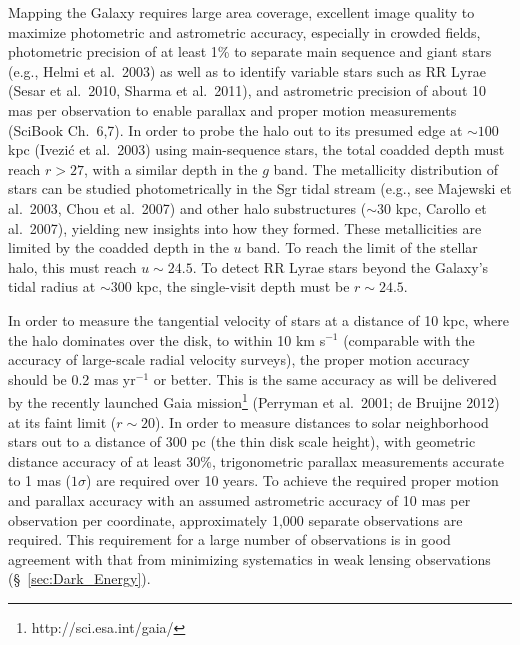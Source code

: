 Mapping the Galaxy requires large area coverage, excellent image
quality to maximize photometric and astrometric accuracy,
especially in crowded fields, photometric precision of at least 1\% to
separate main sequence and
giant stars (e.g., Helmi et al.~2003) as well as to identify variable
stars such as RR Lyrae (Sesar et al.~2010, Sharma et al.~2011),
and astrometric precision of about 10 mas per observation to enable parallax and proper motion measurements
(SciBook Ch.~6,7). In order to probe the halo out to its presumed edge at $\sim100$ kpc (Ivezi\'{c} et al.~2003) using
main-sequence stars, the total coadded depth must reach $r > 27$, with a similar depth in the $g$ band.
The metallicity distribution of stars can be studied photometrically in the Sgr tidal stream (e.g., see
Majewski et al.~2003, Chou et al.~2007) and other halo substructures
($\sim 30$ kpc, Carollo et al.~2007), yielding new insights into how
they formed.  These
metallicities are limited by the coadded depth in the $u$ band.  To reach the limit of the stellar halo, this must reach
$u\sim24.5$. To detect RR Lyrae stars beyond the Galaxy's tidal radius at $\sim 300$ kpc, the single-visit depth must
be $r \sim  24.5$.

In order to measure the tangential velocity of stars at a distance of 10 kpc, where the halo dominates over the disk, to
within 10 km s$^{-1}$ (comparable with the accuracy of
large-scale radial velocity surveys), the proper motion
accuracy should be 0.2 mas yr$^{-1}$ or better. This is the same accuracy as will be delivered by the recently launched Gaia mission\footnote{http://sci.esa.int/gaia/} (Perryman et al.~2001; de Bruijne 2012) at its faint limit ($r \sim 20$).
In order to measure distances to solar neighborhood stars out to a distance of 300 pc (the thin disk scale height),
with geometric distance accuracy of at least 30\%, trigonometric parallax measurements accurate to 1 mas ($1\sigma$)
are required over 10 years. To achieve the required proper motion and parallax accuracy with an assumed astrometric
accuracy of 10 mas per observation per coordinate, approximately 1,000
separate observations are required. This requirement for a large
number of observations is in good agreement with that from minimizing
systematics in weak lensing observations (\S~\ref{sec:Dark_Energy}).



